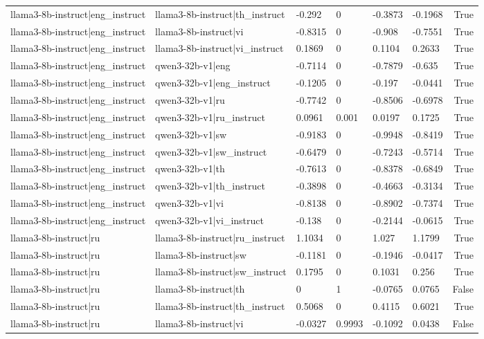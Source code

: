 \begin{table}
\begin{tabular}{llllllr}
llama3-8b-instruct|eng_instruct & llama3-8b-instruct|th_instruct & -0.292 & 0 & -0.3873 & -0.1968 & True \\
llama3-8b-instruct|eng_instruct & llama3-8b-instruct|vi & -0.8315 & 0 & -0.908 & -0.7551 & True \\
llama3-8b-instruct|eng_instruct & llama3-8b-instruct|vi_instruct & 0.1869 & 0 & 0.1104 & 0.2633 & True \\
llama3-8b-instruct|eng_instruct & qwen3-32b-v1|eng & -0.7114 & 0 & -0.7879 & -0.635 & True \\
llama3-8b-instruct|eng_instruct & qwen3-32b-v1|eng_instruct & -0.1205 & 0 & -0.197 & -0.0441 & True \\
llama3-8b-instruct|eng_instruct & qwen3-32b-v1|ru & -0.7742 & 0 & -0.8506 & -0.6978 & True \\
llama3-8b-instruct|eng_instruct & qwen3-32b-v1|ru_instruct & 0.0961 & 0.001 & 0.0197 & 0.1725 & True \\
llama3-8b-instruct|eng_instruct & qwen3-32b-v1|sw & -0.9183 & 0 & -0.9948 & -0.8419 & True \\
llama3-8b-instruct|eng_instruct & qwen3-32b-v1|sw_instruct & -0.6479 & 0 & -0.7243 & -0.5714 & True \\
llama3-8b-instruct|eng_instruct & qwen3-32b-v1|th & -0.7613 & 0 & -0.8378 & -0.6849 & True \\
llama3-8b-instruct|eng_instruct & qwen3-32b-v1|th_instruct & -0.3898 & 0 & -0.4663 & -0.3134 & True \\
llama3-8b-instruct|eng_instruct & qwen3-32b-v1|vi & -0.8138 & 0 & -0.8902 & -0.7374 & True \\
llama3-8b-instruct|eng_instruct & qwen3-32b-v1|vi_instruct & -0.138 & 0 & -0.2144 & -0.0615 & True \\
llama3-8b-instruct|ru & llama3-8b-instruct|ru_instruct & 1.1034 & 0 & 1.027 & 1.1799 & True \\
llama3-8b-instruct|ru & llama3-8b-instruct|sw & -0.1181 & 0 & -0.1946 & -0.0417 & True \\
llama3-8b-instruct|ru & llama3-8b-instruct|sw_instruct & 0.1795 & 0 & 0.1031 & 0.256 & True \\
llama3-8b-instruct|ru & llama3-8b-instruct|th & 0 & 1 & -0.0765 & 0.0765 & False \\
llama3-8b-instruct|ru & llama3-8b-instruct|th_instruct & 0.5068 & 0 & 0.4115 & 0.6021 & True \\
llama3-8b-instruct|ru & llama3-8b-instruct|vi & -0.0327 & 0.9993 & -0.1092 & 0.0438 & False \\

\end{tabular}
\end{table}
